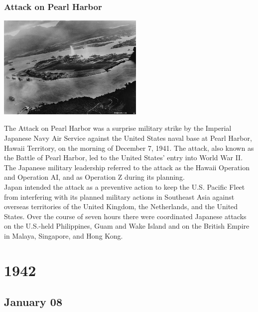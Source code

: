 \documentclass[11pt]{report}
\begin{document}
\subsection{Attack on Pearl Harbor}
\vspace{2mm}\begin{center}\includegraphics[width=7cm]{./img/attackOnPearlHarbor.jpg}\end{center}
The Attack on Pearl Harbor was a surprise military strike by the Imperial Japanese Navy Air Service against the United States naval base at Pearl Harbor, Hawaii Territory, on the morning of December 7, 1941. The attack, also known as the Battle of Pearl Harbor, led to the United States' entry into World War II. The Japanese military leadership referred to the attack as the Hawaii Operation and Operation AI, and as Operation Z during its planning.\\
\indent Japan intended the attack as a preventive action to keep the U.S. Pacific Fleet from interfering with its planned military actions in Southeast Asia against overseas territories of the United Kingdom, the Netherlands, and the United States. Over the course of seven hours there were coordinated Japanese attacks on the U.S.-held Philippines, Guam and Wake Island and on the British Empire in Malaya, Singapore, and Hong Kong.

\chapter{1942}
\section{January 08}
\end{document}
